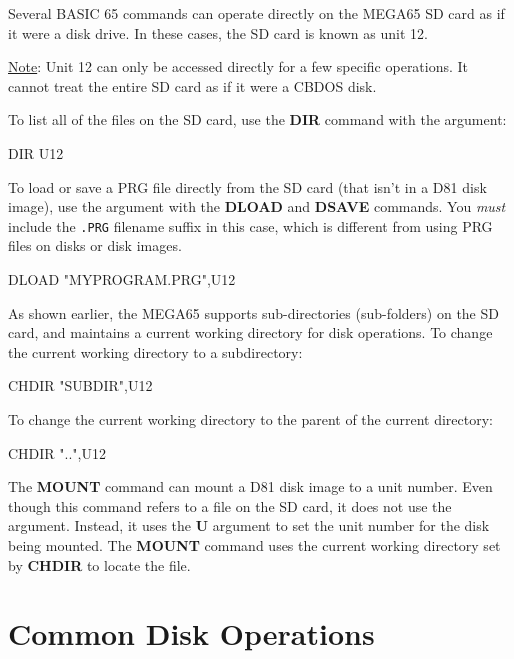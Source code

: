 Several BASIC 65 commands can operate directly on the MEGA65 SD card as if it were a disk drive. In these cases, the SD card is known as unit 12.

\underline{Note}: Unit 12 can only be accessed directly for a few specific operations. It cannot treat the entire SD card as if it were a CBDOS disk.

To list all of the files on the SD card, use the {\bf DIR} command with the  argument:

\begin{screenoutput}
DIR U12
\end{screenoutput}

To load or save a PRG file directly from the SD card (that isn't in a D81 disk image), use the  argument with the {\bf DLOAD} and {\bf DSAVE} commands. You {\em must} include the {\tt .PRG} filename suffix in this case, which is different from using PRG files on disks or disk images.

\begin{screenoutput}
DLOAD "MYPROGRAM.PRG",U12
\end{screenoutput}

As shown earlier, the MEGA65 supports sub-directories (sub-folders) on the SD card, and maintains a current working directory for disk operations. To change the current working directory to a subdirectory:

\begin{screenoutput}
CHDIR "SUBDIR",U12
\end{screenoutput}

To change the current working directory to the parent of the current directory:

\begin{screenoutput}
CHDIR "..",U12
\end{screenoutput}

The {\bf MOUNT} command can mount a D81 disk image to a unit number. Even though this command refers to a file on the SD card, it does not use the  argument. Instead, it uses the {\bf U} argument to set the unit number for the disk being mounted. The {\bf MOUNT} command uses the current working directory set by {\bf CHDIR} to locate the file.


\section{Common Disk Operations}

